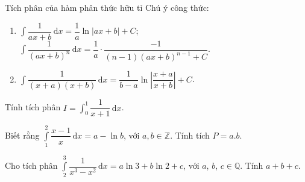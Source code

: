 \begin{dang}{Tích phân của hàm phân thức hữu tỉ}
	Chú ý công thức:
	\begin{enumerate}
		\item $\displaystyle \int \dfrac{1}{ax+b}\mathrm{\,d}x= \dfrac{1}{a}\ln|ax+b|+C$; $\displaystyle \int \dfrac{1}{(ax+b)^n}\mathrm{\,d}x= \dfrac{1}{a}\cdot \dfrac{-1}{(n-1)(ax+b)^{n-1}+C}$.
		\item $\displaystyle \int \dfrac{1}{(x+a)(x+b)}\mathrm{\,d}x=\dfrac{1}{b-a}\ln{\left| \dfrac{x+a}{x+b}\right|}+C$.
		
	\end{enumerate}
\end{dang}
\setcounter{vd}{0}
\begin{vd}%
	Tính tích phân $I=\displaystyle\int_0^1 \dfrac{1}{x+1}\mathrm{\,d}x$.
\end{vd}



\begin{vd}%
	Biết rằng $\displaystyle \int \limits_1^2 \dfrac{x-1}{x} \mathrm{\,d}x=a-\ln b$, với $a,b \in \mathbb{Z}$. Tính tích $P=a.b$.
	
\end{vd}

\begin{vd}%
	Cho tích phân $\displaystyle\int\limits _2^3 \dfrac{1}{x^3-x^2}\mathrm{\,d}x=a\ln 3+ b\ln 2+c$, với $a$, $b$, $c\in\mathbb{Q}$. Tính $a+b+c$.
	
	
\end{vd}


